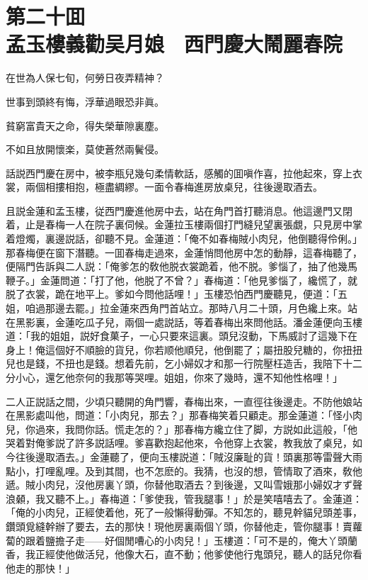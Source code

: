 
\chapter*{第二十囬　\\孟玉樓義勸吴月娘　西門慶大鬧麗春院}


\begin{myquote}
在世為人保七旬，何勞日夜弄精神？

世事到頭終有悔，浮華過眼恐非眞。

貧窮富貴天之命，得失榮華隙裏塵。

不如且放開懷楽，莫使蒼然兩鬢侵。
\end{myquote}

話説西門慶在房中，被李瓶兒幾句柔情軟話，感觸的囬嗔作喜，拉他起來，穿上衣裳，兩個相摟相抱，極盡綢繆。一面令春梅進房放桌兒，往後邊取酒去。

且説金蓮和孟玉樓，従西門慶進他房中去，站在角門首打聽消息。他這邊門又閉着，止是春梅一人在院子裏伺候。金蓮拉玉樓兩個打門縫兒望裏張覷，只見房中掌着燈燭，裏邊説話，卻聽不見。金蓮道：「俺不如春梅賊小肉兒，他倒聽得伶俐。」那春梅便在窗下潛聽。一囬春梅走過來，金蓮悄問他房中怎的動靜，這春梅聽了，便隔門告訴與二人説：「俺爹怎的敎他脱衣裳跪着，他不脱。爹惱了，抽了他幾馬鞭子。」金蓮問道：「打了他，他脱了不曾？」春梅道：「他見爹惱了，纔慌了，就脱了衣裳，跪在地平上。爹如今問他話哩！」玉樓恐怕西門慶聽見，便道：「五姐，咱過那邊去罷。」拉金蓮來西角門首站立。那時八月二十頭，月色纔上來。站在黑影裏，金蓮吃瓜子兒，兩個一處説話，等着春梅出來問他話。潘金蓮便向玉樓道：「我的姐姐，説好食菓子，一心只要來這裏。頭兒沒動，下馬威討了這幾下在身上！俺這個好不順臉的貨兒，你若顺他順兒，他倒罷了；屬扭股兒糖的，你扭扭兒也是錢，不扭也是錢。想着先前，乞小婦奴才和那一行院壓枉造舌，我陪下十二分小心，還乞他奈何的我那等哭哩。姐姐，你來了幾時，還不知他性格哩！」

二人正説話之間，少頃只聽開的角門響，春梅出來，一直徑往後邊走。不防他娘站在黑影處叫他，問道：「小肉兒，那去？」那春梅笑着只顧走。那金蓮道：「怪小肉兒，你過來，我問你話。慌走怎的？」那春梅方纔立住了脚，方説如此這般，「他哭着對俺爹説了許多説話哩。爹喜歡抱起他來，令他穿上衣裳，教我放了桌兒，如今往後邊取酒去。」金蓮聽了，便向玉樓説道：「賊沒廉耻的貨！頭裏那等雷聲大雨點小，打哩亂哩。及到其間，也不怎麽的。我猜，也沒的想，管情取了酒來，敎他遞。賊小肉兒，沒他房裏丫頭，你替他取酒去？到後邊，又叫雪娥那小婦奴才ず聲浪顙，我又聽不上。」春梅道：「爹使我，管我腿事！」於是笑嘻嘻去了。金蓮道：「俺的小肉兒，正經使着他，死了一般懶得動彈。不知怎的，聽見幹貓兒頭差事，鑽頭覓縫幹辦了要去，去的那快！現他房裏兩個丫頭，你替他走，管你腿事！賣蘿蔔的跟着鹽擔子走——好個閒嘈心的小肉兒！」玉樓道：「可不是的，俺大丫頭蘭香，我正經使他做活兒，他像大石，直不動；他爹使他行鬼頭兒，聽人的話兒你看他走的那快！」

